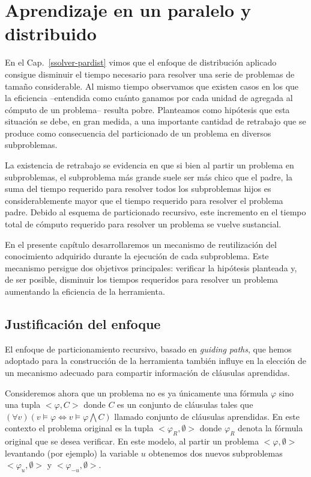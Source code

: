 \chapter{Aprendizaje en un \ssolver paralelo y distribuido}
\label{aprendizaje-pardist}

En el Cap.~\ref{ssolver-pardist} vimos que el enfoque de distribución aplicado
consigue disminuir el tiempo necesario para resolver una serie de problemas de
tamaño considerable. Al mismo tiempo observamos que existen casos en los que
la eficiencia --entendida como cuánto ganamos por cada unidad de \hard
agregada al cómputo de un problema-- resulta pobre. Planteamos como hipótesis
que esta situación se debe, en gran medida, a una importante cantidad de
retrabajo que se produce como consecuencia del particionado de un problema en
diversos subproblemas. 

La existencia de retrabajo se evidencia en que si bien al partir un problema
en subproblemas, el subproblema más grande suele ser más chico que el padre,
la suma del tiempo requerido para resolver todos los subproblemas hijos es
considerablemente mayor que el tiempo requerido para resolver el problema
padre. Debido al esquema de particionado recursivo, este incremento en el
tiempo total de cómputo requerido para resolver un problema se vuelve
sustancial.

En el presente capítulo desarrollaremos un mecanismo de reutilización del
conocimiento adquirido durante la ejecución de cada subproblema. Este
mecanismo persigue dos objetivos principales: verificar la hipótesis planteada
y, de ser posible,  disminuir los tiempos requeridos para resolver un problema
aumentando la eficiencia de la herramienta.

\section{Justificación del enfoque}

El enfoque de particionamiento recursivo, basado en \emph{guiding paths}, que
hemos adoptado para la construcción de la herramienta también influye en la
elección de un mecanismo adecuado para compartir información de cláusulas
aprendidas. 

\newcommand{\roottask}{\ensuremath{<\varphi_R, \emptyset>}\xspace}
\newcommand{\task}{\ensuremath{<\varphi, \emptyset>}\xspace}
\newcommand{\nonemptytask}{\ensuremath{<\varphi, C>}\xspace}

Consideremos ahora que un problema no es ya únicamente una fórmula $\varphi$
sino una tupla $<\varphi, C>$ donde $C$ es un conjunto de cláusulas tales que
$(\forall v) (v \models \varphi \Longleftrightarrow v \models \varphi
\bigwedge C)$ llamado conjunto de cláusulas aprendidas. En este contexto el
problema original es la tupla \roottask donde $\varphi_R$ denota la fórmula
original que se desea verificar. En este modelo, al partir un problema \task
levantando (por ejemplo) la variable $u$ obtenemos dos nuevos subproblemas
$<\varphi_u, \emptyset>$ y $<\varphi_{-u}, \emptyset>$. 


